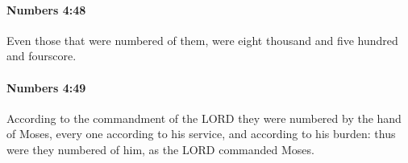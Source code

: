 		\paragraph{Numbers 4:48} %
			\label{NUMBERS-4-48}

			Even those that were numbered of them, were eight thousand and five hundred and fourscore.


		\paragraph{Numbers 4:49} %
			\label{NUMBERS-4-49}

			According to the commandment of the LORD they were numbered by the hand of Moses, every one according to his service, and according to his burden: thus were they numbered of him, as the LORD commanded Moses.

